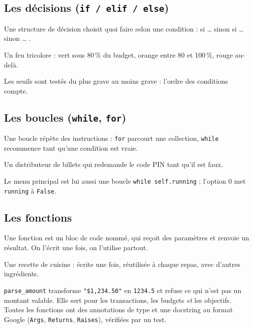 \documentclass[11pt,a4paper]{article}
\newcommand{\code}[1]{{\NoAutoSpacing\texttt{#1}}}
\begin{document}
\subsection{Les décisions (\code{if / elif / else})}
\begin{definition}
Une structure de décision choisit quoi faire selon une condition : \og si \dots{} sinon si
\dots{} sinon \dots{} \fg.
\end{definition}
\begin{analogie}
Un feu tricolore : vert sous 80\,\% du budget, orange entre 80 et 100\,\%, rouge au-delà.
\end{analogie}

Les seuils sont testés du plus grave au moins grave : l'ordre des conditions compte.

\subsection{Les boucles (\code{while}, \code{for})}
\begin{definition}
Une boucle répète des instructions : \code{for} parcourt une collection, \code{while}
recommence tant qu'une condition est vraie.
\end{definition}
\begin{analogie}
Un distributeur de billets qui redemande le code PIN tant qu'il est faux.
\end{analogie}

Le menu principal est lui aussi une boucle \code{while self.running} ; l'option 0 met
\code{running} à \code{False}.

\subsection{Les fonctions}
\begin{definition}
Une fonction est un bloc de code nommé, qui reçoit des paramètres et renvoie un résultat. On
l'écrit une fois, on l'utilise partout.
\end{definition}
\begin{analogie}
Une recette de cuisine : écrite une fois, réutilisée à chaque repas, avec d'autres
ingrédients.
\end{analogie}
\code{parse\_amount} transforme \code{"\$1,234.50"} en \code{1234.5} et refuse ce qui n'est
pas un montant valable. Elle sert pour les transactions, les budgets \emph{et} les objectifs.
Toutes les fonctions ont des annotations de type et une docstring au format Google
(\code{Args}, \code{Returns}, \code{Raises}), vérifiées par un test.
\end{document}
